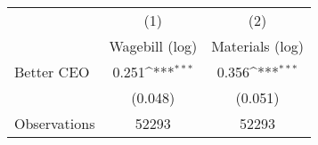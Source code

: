 {
\def\sym#1{\ifmmode^{#1}\else\(^{#1}\)\fi}
\begin{tabular}{l*{2}{c}}
\hline\hline
                    &\multicolumn{1}{c}{(1)}&\multicolumn{1}{c}{(2)}\\
                    &\multicolumn{1}{c}{Wagebill (log)}&\multicolumn{1}{c}{Materials (log)}\\
\hline
Better CEO          &       0.251\sym{***}&       0.356\sym{***}\\
                    &     (0.048)         &     (0.051)         \\
\hline
Observations        &       52293         &       52293         \\
\hline\hline
\end{tabular}
}
